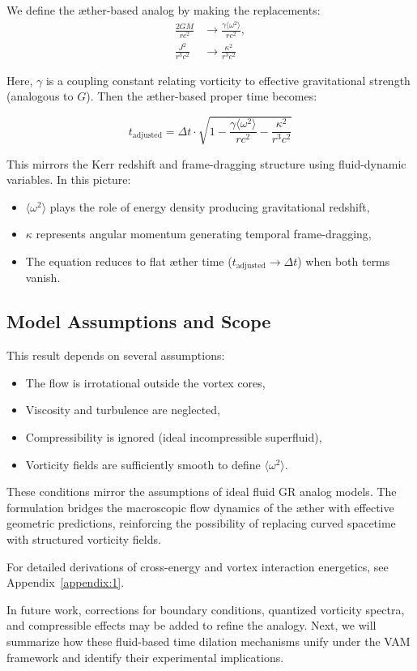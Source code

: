 We define the æther-based analog by making the replacements:
\begin{equation}
    \begin{aligned}
        \frac{2GM}{rc^2} &\rightarrow \frac{\gamma \langle \omega^2 \rangle}{rc^2}, \\
        \frac{J^2}{r^3c^2} &\rightarrow \frac{\kappa^2}{r^3c^2}
    \end{aligned}
\label{eq:Kerr_replacements}
\end{equation}

Here, $\gamma$ is a coupling constant relating vorticity to effective gravitational strength (analogous to $G$). Then the æther-based proper time becomes:

\begin{equation}
    \boxed{t_{\text{adjusted}} = \Delta t \cdot \sqrt{1 - \frac{\gamma \langle \omega^2 \rangle}{rc^2} - \frac{\kappa^2}{r^3c^2}}}
    \label{eq:Kerr_time_dilation_ae}
\end{equation}

This mirrors the Kerr redshift and frame-dragging structure using fluid-dynamic variables. In this picture:
\begin{itemize}
    \item $\langle \omega^2 \rangle$ plays the role of energy density producing gravitational redshift,
    \item $\kappa$ represents angular momentum generating temporal frame-dragging,
    \item The equation reduces to flat æther time ($t_{\text{adjusted}} \to \Delta t$) when both terms vanish.
\end{itemize}

\subsection{Model Assumptions and Scope}

This result depends on several assumptions:
\begin{itemize}
    \item The flow is irrotational outside the vortex cores,
    \item Viscosity and turbulence are neglected,
    \item Compressibility is ignored (ideal incompressible superfluid),
    \item Vorticity fields are sufficiently smooth to define $\langle \omega^2 \rangle$.
\end{itemize}

These conditions mirror the assumptions of ideal fluid GR analog models. The formulation bridges the macroscopic flow dynamics of the æther with effective geometric predictions, reinforcing the possibility of replacing curved spacetime with structured vorticity fields.

For detailed derivations of cross-energy and vortex interaction energetics, see Appendix~\ref{appendix:1}.

In future work, corrections for boundary conditions, quantized vorticity spectra, and compressible effects may be added to refine the analogy. Next, we will summarize how these fluid-based time dilation mechanisms unify under the VAM framework and identify their experimental implications.

